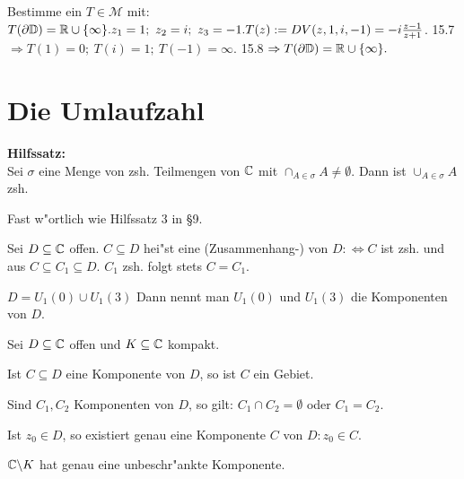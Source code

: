 \documentclass[a4paper,twoside,DIV15,BCOR12mm]{scrbook}
\begin{document}
\begin{beispiel}
Bestimme ein $T \in \mathcal{M}$ mit: $T(\partial \mathbb{D}) = \mathbb{R} \cup \{ \infty \}. z_1 = 1; \ z_2=i; \ z_3 = -1. T(z) := DV(z,1,i,-1) = -i\frac{z-1}{z+1}$. 15.7 $\Rightarrow T(1) = 0; \ T(i) = 1; \ T(-1) = \infty.$ 15.8 $\Rightarrow T(\partial \mathbb{D}) = \mathbb{R} \cup \{ \infty \}.$
\end{beispiel}


\chapter{Die Umlaufzahl}
{\bf Hilfssatz:}\\
Sei $\sigma$ eine Menge von zsh. Teilmengen von $\mathbb{C}$ mit $\cap_{A \in \sigma} A \not= \emptyset$. Dann ist $\cup_{A \in \sigma} A$ zsh.

\begin{beweis}
Fast w"ortlich wie Hilfssatz 3 in §9.
\end{beweis}

\begin{definition}
Sei $D \subseteq \mathbb{C}$ offen. $C \subseteq D$ hei"st eine (Zusammenhang-) von $D :\Leftrightarrow C$ ist zsh. und aus $C \subseteq C_1 \subseteq D$. $C_1$ zsh. folgt stets $C=C_1$.
\end{definition}

\begin{beispiel}
$D = U_1(0) \cup U_1(3)$ Dann nennt man $U_1(0)$ und $U_1(3)$ die Komponenten von $D$.
\end{beispiel}

\begin{satz}
Sei $D \subseteq \mathbb{C}$ offen und $K \subseteq \mathbb{C}$ kompakt.
\begin{liste}
\item Ist $C \subseteq D$ eine Komponente von $D$, so ist $C$ ein Gebiet.
\item Sind $C_1,C_2$ Komponenten von $D$, so gilt: $C_1 \cap C_2 = \emptyset$ oder $C_1 = C_2$.
\item Ist $z_0 \in D$, so  existiert genau eine Komponente $C$ von $D: z_0 \in C$.
\item $\mathbb{C} \backslash K$ hat genau eine unbeschr"ankte Komponente.
\end{liste}
\end{satz}
\end{document}
